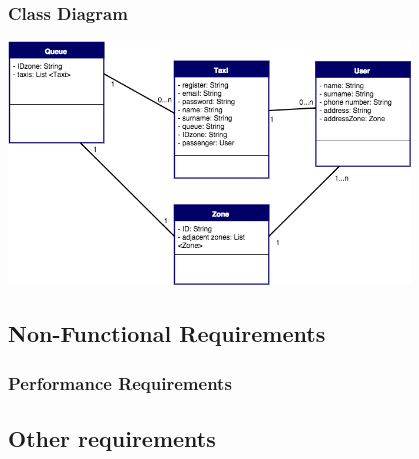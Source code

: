 \subsubsection{Class Diagram}
\begin{center}

\includegraphics[width=0.80\textwidth]{./images/ClassDiagram.png}
	\end{center}
	\subsection{Non-Functional Requirements}
		\subsubsection{Performance Requirements}
	\subsection{Other requirements}